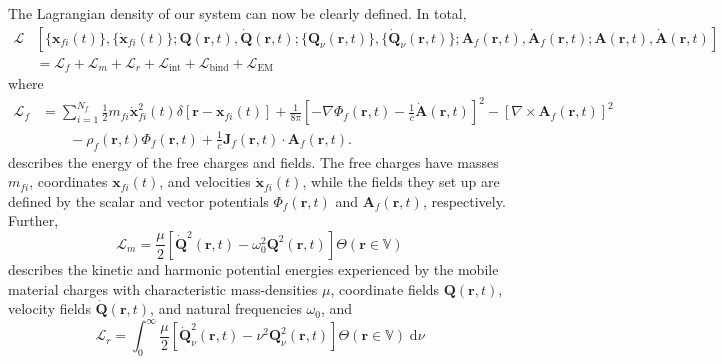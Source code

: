 \documentclass{article}
\begin{document}
The Lagrangian density of our system can now be clearly defined. In total,
\begin{equation}\label{eq:lagrangianDensityMQED}
\begin{split}
\mathcal{L}&\left[\{\mathbf{x}_{fi}(t)\},\{\dot{\mathbf{x}}_{fi}(t)\};\mathbf{Q}(\mathbf{r},t),\dot{\mathbf{Q}}(\mathbf{r},t);\{\mathbf{Q}_\nu(\mathbf{r},t)\},\{\dot{\mathbf{Q}}_\nu(\mathbf{r},t)\};\mathbf{A}_f(\mathbf{r},t),\dot{\mathbf{A}}_f(\mathbf{r},t);\mathbf{A}(\mathbf{r},t),\dot{\mathbf{A}}(\mathbf{r},t)\right]\\
&= \mathcal{L}_f + \mathcal{L}_m + \mathcal{L}_r + \mathcal{L}_\mathrm{int} + \mathcal{L}_\mathrm{bind} + \mathcal{L}_\mathrm{EM}
\end{split}
\end{equation}
where
\begin{equation}
\begin{split}
\mathcal{L}_f &= \sum_{i = 1}^{N_f}\frac{1}{2}m_{fi}\dot{\mathbf{x}}_{fi}^2(t)\delta[\mathbf{r} - \mathbf{x}_{fi}(t)] + \frac{1}{8\pi}\left[-\nabla\Phi_f(\mathbf{r},t) - \frac{1}{c}\dot{\mathbf{A}}(\mathbf{r},t)\right]^2 - \left[\nabla\times\mathbf{A}_f(\mathbf{r},t)\right]^2\\
&\qquad - \rho_f(\mathbf{r},t)\Phi_f(\mathbf{r},t) + \frac{1}{c}\mathbf{J}_f(\mathbf{r},t)\cdot\mathbf{A}_f(\mathbf{r},t).
\end{split}
\end{equation}
describes the energy of the free charges and fields. The free charges have masses $m_{fi}$, coordinates $\mathbf{x}_{fi}(t)$, and velocities $\dot{\mathbf{x}}_{fi}(t)$, while the fields they set up are defined by the scalar and vector potentials $\Phi_f(\mathbf{r},t)$ and $\mathbf{A}_f(\mathbf{r},t)$, respectively. Further,
\begin{equation}\label{eq:lagrangianDensityM}
\mathcal{L}_m = \frac{\mu}{2}\left[\dot{\mathbf{Q}}^2(\mathbf{r},t) - \omega_0^2\mathbf{Q}^2(\mathbf{r},t)\right]\Theta(\mathbf{r}\in\mathbb{V})
\end{equation}
describes the kinetic and harmonic potential energies experienced by the mobile material charges with characteristic mass-densities $\mu$, coordinate fields $\mathbf{Q}(\mathbf{r},t)$, velocity fields $\dot{\mathbf{Q}}(\mathbf{r},t)$, and natural frequencies $\omega_0$, and
\begin{equation}
\mathcal{L}_r = \int_0^\infty\frac{\mu}{2}\left[\dot{\mathbf{Q}}_\nu^2(\mathbf{r},t) - \nu^2\mathbf{Q}_\nu^2(\mathbf{r},t)\right]\Theta(\mathbf{r}\in\mathbb{V})\;\mathrm{d}\nu
\end{equation}
\end{document}

